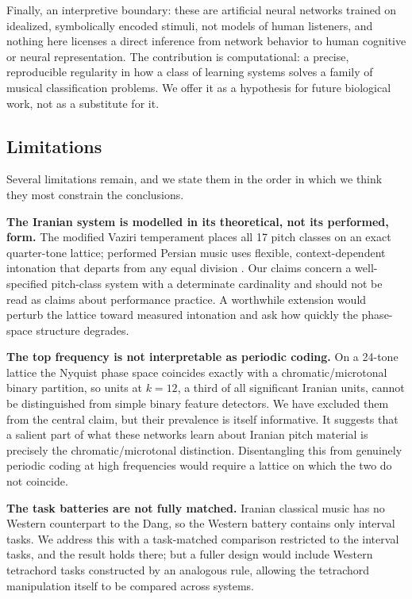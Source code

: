\documentclass[pdflatex,sn-nature]{sn-jnl}
\begin{document}
Finally, an interpretive boundary: these are artificial neural networks trained on idealized,
symbolically encoded stimuli, not models of human listeners, and nothing here licenses a
direct inference from network behavior to human cognitive or neural representation. The
contribution is computational: a precise, reproducible regularity in how a class of learning
systems solves a family of musical classification problems. We offer it as a hypothesis for
future biological work, not as a substitute for it.

\subsection{Limitations}
Several limitations remain, and we state them in the order in which we think they most
constrain the conclusions.

\textbf{The Iranian system is modelled in its theoretical, not its performed, form.} The
modified Vaziri temperament places all 17 pitch classes on an exact quarter-tone lattice;
performed Persian music uses flexible, context-dependent intonation that departs from any
equal division \cite{farhat1990}. Our claims concern a well-specified pitch-class system
with a determinate cardinality and should not be read as claims about performance practice.
A worthwhile extension would perturb the lattice toward measured intonation and ask how
quickly the phase-space structure degrades.

\textbf{The top frequency is not interpretable as periodic coding.} On a 24-tone lattice the
Nyquist phase space coincides exactly with a chromatic/microtonal binary partition, so units
at $k=12$, a third of all significant Iranian units, cannot be distinguished from simple
binary feature detectors. We have excluded them from the central claim, but their prevalence
is itself informative. It suggests that a salient part of what these networks learn about
Iranian pitch material is precisely the chromatic/microtonal distinction. Disentangling this
from genuinely periodic coding at high frequencies would require a lattice on which the two
do not coincide.

\textbf{The task batteries are not fully matched.} Iranian classical music has no Western
counterpart to the Dang, so the Western battery contains only interval tasks. We address
this with a task-matched comparison restricted to the interval tasks, and the result holds
there; but a fuller design would include Western tetrachord tasks constructed by an
analogous rule, allowing the tetrachord manipulation itself to be compared across systems.
\end{document}
